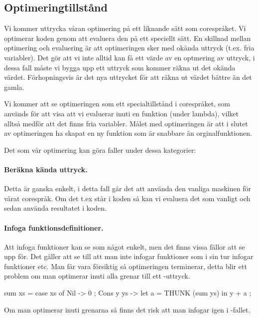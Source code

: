 \documentclass[Rapport]{subfiles}
\begin{document}
\subsection{Optimeringtillstånd}

Vi kommer uttrycka våran optimering på ett liknande sätt som corespråket. Vi optimerar
koden genom att evaluera den på ett speciellt sätt. En skillnad mellan optimering och
evaluering är att optimeringen sker med okända uttryck (t.ex. fria variabler). 
Det gör att vi inte alltid kan få ett värde av en optmering av uttryck, i dessa
fall måste vi bygga upp ett uttryck som kommer räkna ut det okända värdet. Förhopningsvis
är det nya uttrycket för att räkna ut värdet bättre än det gamla.

Vi kommer att se optimeringen som ett specialtillstånd i corespråket, som används
för att visa att vi evaluerar inuti en funktion (under lambda), vilket alltså medför
att det finns fria variabler. Målet med optimeringen är att i slutet av optimeringen
ha skapat en ny funktion som är snabbare än orginalfunktionen.

Det som vår optimering kan göra faller under dessa kategorier:

\paragraph{ Beräkna kända uttryck. }

Detta är ganska enkelt, i detta fall går det att använda den vanliga
maskinen för vårat corespråk. Om det t.ex står  i koden så kan vi evaluera
det som vanligt och sedan använda resultatet  i koden.

\paragraph{ Infoga funktionsdefinitioner. }

Att infoga funktioner kan se som något enkelt, men det finns vissa fällor att se upp
för. Det gäller att se till att man inte infogar funktioner som i sin tur infogar funktioner etc.
Man får vara försiktig så optimeringen terminerar, detta blir ett problem om man
optimerar inuti alla grenar till ett -uttryck.

\begin{codeEx}
sum xs = case xs of
    { Nil -> 0
    ; Cons y ys -> let
        { a = THUNK (sum ys)
        } in y + a
    };
\end{codeEx}

Om man optimerar  inuti grenarna så finns det risk att man infogar 
igen i -fallet.
\end{document}
